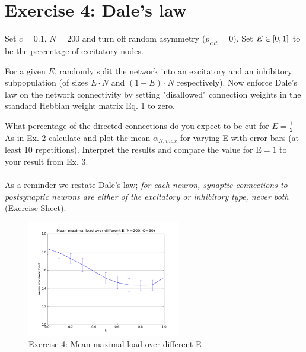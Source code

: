 \section{Exercise 4: Dale's law}

\begin{itshape}
\small
Set $c=0.1$, $N = 200$ and turn off random asymmetry ($p_{cut} = 0$). Set $E \in \left[0, 1\right]$ to be the percentage of excitatory nodes.

For a given $E$, randomly split the network into an excitatory and an inhibitory subpopulation (of sizes $E \cdot N$ and $(1 - E) \cdot N$ respectively). Now enforce Dale's law on the network connectivity by setting "disallowed" connection weights in the standard Hebbian weight matrix Eq. 1 to zero.

What percentage of the directed connections do you expect to be cut for $E = \frac{1}{2}$
As in Ex. 2 calculate and plot the mean $\alpha_{N,max}$ for varying E with error bars (at least 10 repetitions). Interpret the results and compare the value for E$ = 1$ to your result from Ex. 3.
\end{itshape}

\paragraph*{}

As a reminder we restate Dale's law; \textit{for each neuron, synaptic connections to postsynaptic neurons are either of the excitatory or inhibitory type, never both} (Exercise Sheet).

\begin{figure}[H]
  \begin{center}
    \includegraphics[width=0.6\textwidth]{dat/ex4-mean_max_load-N200-Q50-C95.png}
  \end{center}
  \vspace{-20pt}
  \caption{Exercise 4: Mean maximal load over different E}
  \label{fig: exercise 4}
\end{figure}

